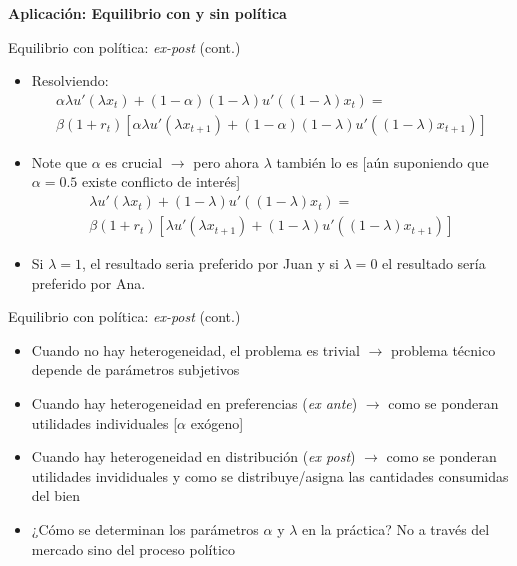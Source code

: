 \documentclass[
  ignorenonframetext,
]{beamer}
\providecommand{\tightlist}{%
  \setlength{\itemsep}{0pt}\setlength{\parskip}{0pt}}\usepackage{longtable,booktabs,array}
\begin{document}
\begin{frame}{\textbf{Aplicación: Equilibrio con y sin política}}
\begin{block}{Equilibrio con política: \emph{ex-post} (cont.)}
\protect\hypertarget{equilibrio-con-poluxedtica-ex-post-cont.}{}
\begin{itemize}
\tightlist
\item
  Resolviendo: \[\begin{aligned}
    \alpha \lambda u'(\lambda
          x_{t})+(1-\alpha)(1-\lambda)u'((1-\lambda)x_{t})= \\
          \beta(1+r_{t})\left[\alpha \lambda u'(\lambda
          x_{t+1})+(1-\alpha)(1-\lambda)u'((1-\lambda)x_{t+1})\right]
        \end{aligned}\]
\item
  Note que \(\alpha\) es crucial \(\longrightarrow\) pero ahora
  \(\lambda\) también lo es {[}aún suponiendo que \(\alpha=0.5\) existe
  conflicto de interés{]} \[\begin{aligned}
  \lambda u'(\lambda
              x_{t})+(1-\lambda)u'((1-\lambda)x_{t})= \\
              \beta(1+r_{t})\left[\lambda u'(\lambda
          x_{t+1})+(1-\lambda)u'((1-\lambda)x_{t+1})\right]
              \end{aligned}\]
\item
  Si \(\lambda=1\), el resultado seria preferido por Juan y si
  \(\lambda=0\) el resultado sería preferido por Ana.
\end{itemize}
\end{block}

\begin{block}{Equilibrio con política: \emph{ex-post} (cont.)}
\protect\hypertarget{equilibrio-con-poluxedtica-ex-post-cont.-1}{}
\begin{itemize}
\tightlist
\item
  Cuando no hay heterogeneidad, el problema es trivial
  \(\longrightarrow\) problema técnico depende de parámetros subjetivos
\item
  Cuando hay heterogeneidad en preferencias (\emph{ex ante})
  \(\longrightarrow\) como se ponderan utilidades individuales
  {[}\(\alpha\) exógeno{]}
\item
  Cuando hay heterogeneidad en distribución (\emph{ex post})
  \(\longrightarrow\) como se ponderan utilidades invididuales y como se
  distribuye/asigna las cantidades consumidas del bien
\item
  ¿Cómo se determinan los parámetros \(\alpha\) y \(\lambda\) en la
  práctica? No a través del mercado sino del proceso político
\end{itemize}
\end{block}
\end{frame}
\end{document}
